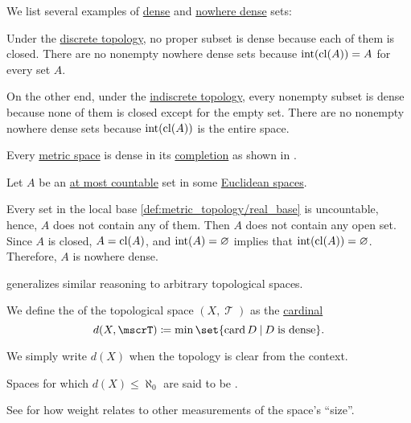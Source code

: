 \begin{example}\label{ex:def:topologically_dense_set}
  We list several examples of \hyperref[def:topologically_dense_set]{dense} and \hyperref[def:topologically_dense_set]{nowhere dense} sets:
  \begin{thmenum}
     Under the \hyperref[def:discrete_topology]{discrete topology}, no proper subset is dense because each of them is closed. There are no nonempty nowhere dense sets because \( \operatorname{int}(\operatorname{cl}(A)) = A \) for every set \( A \).

     On the other end, under the \hyperref[def:indiscrete_topology]{indiscrete topology}, every nonempty subset is dense because none of them is closed except for the empty set. There are no nonempty nowhere dense sets because \( \operatorname{int}(\operatorname{cl}(A)) \) is the entire space.

     Every \hyperref[def:metric_space]{metric space} is dense in its \hyperref[thm:metric_space_completion]{completion} as shown in .

     Let \( A \) be an \hyperref[def:set_countability/at_most_countable]{at most countable} set in some \hyperref[def:euclidean_space]{Euclidean spaces}.

    Every set in the local base \eqref{def:metric_topology/real_base} is uncountable, hence, \( A \) does not contain any of them. Then \( A \) does not contain any open set. Since \( A \) is closed, \( A = \operatorname{cl}(A) \), and \( \operatorname{int}(A) = \varnothing \) implies that \( \operatorname{int}(\operatorname{cl}(A)) = \varnothing \). Therefore, \( A \) is nowhere dense.

     generalizes similar reasoning to arbitrary topological spaces.
  \end{thmenum}
\end{example}

\begin{definition}\label{def:topological_space_density}
  We define the  of the topological space \( (X, \mscrT) \) as the \hyperref[def:cardinal]{cardinal}
  \begin{equation*}
    d(X, \mscrT) \coloneqq \min \set{ \card D \given D \T{is dense} }.
  \end{equation*}

  We simply write \( d(X) \) when the topology is clear from the context.

  Spaces for which \( d(X) \leq \hyperref[def:aleph_hierarchy]{\aleph_0} \) are said to be .
\end{definition}
\begin{comments}
  \item See  for how weight relates to other measurements of the space's \enquote{size}.
\end{comments}

